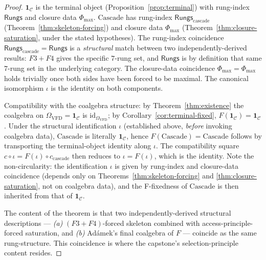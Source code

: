\documentclass[11pt, a4paper]{amsart}
\theoremstyle{definition}
\newcommand{\Rungs}{\mathsf{Rungs}}
\newcommand{\catC}{\mathcal{C}}
\newcommand{\Omegacap}{\Omega_{\mathrm{VFD}}}
\begin{document}
\begin{proof}
$\mathbf{1}_\catC$ is the terminal object
(Proposition~\ref{prop:terminal}) with rung-index $\Rungs$ and
closure data $\Phi_{\max}$. $\mathrm{Cascade}$ has rung-index
$\Rungs_{\mathrm{cascade}}$ (Theorem~\ref{thm:skeleton-forcing})
and closure data $\Phi_{\max}$
(Theorem~\ref{thm:closure-saturation}, under the stated
hypotheses). The rung-index coincidence
$\Rungs_{\mathrm{cascade}} = \Rungs$ is a \emph{structural}
match between two independently-derived results: $F3+F4$ gives
the specific $7$-rung set, and $\Rungs$ is by definition that
same $7$-rung set in the underlying category. The closure-data
coincidence $\Phi_{\max} = \Phi_{\max}$ holds trivially once
both sides have been forced to be maximal. The canonical
isomorphism $\iota$ is the identity on both components.

Compatibility with the coalgebra structure: by
Theorem~\ref{thm:existence} the coalgebra on $\Omegacap =
\mathbf{1}_\catC$ is $\mathrm{id}_{\Omegacap}$; by
Corollary~\ref{cor:terminal-fixed}, $F(\mathbf{1}_\catC) =
\mathbf{1}_\catC$. Under the structural identification $\iota$
(established above, \emph{before} invoking coalgebra data),
$\mathrm{Cascade}$ is literally $\mathbf{1}_\catC$, hence
$F(\mathrm{Cascade}) = \mathrm{Cascade}$ follows by
transporting the terminal-object identity along $\iota$. The
compatibility square $c \circ \iota = F(\iota) \circ
c_{\mathrm{cascade}}$ then reduces to $\iota = F(\iota)$,
which is the identity. Note the non-circularity: the
identification $\iota$ is given by rung-index and closure-data
coincidence (depends only on Theorems~\ref{thm:skeleton-forcing}
and \ref{thm:closure-saturation}, not on coalgebra data), and
the F-fixedness of $\mathrm{Cascade}$ is then inherited from
that of $\mathbf{1}_\catC$.

The content of the theorem is that two independently-derived
structural descriptions — \emph{(a)} $(F3+F4)$-forced skeleton
combined with access-principle-forced saturation, and
\emph{(b)} Ad\'amek's final coalgebra of $F$ — coincide as the
same rung-structure. This coincidence is where the capstone's
selection-principle content resides.
\end{proof}
\end{document}
